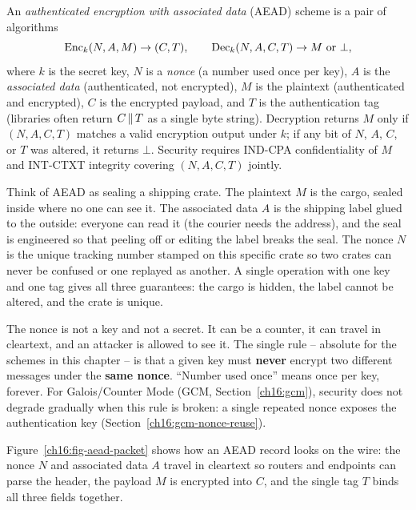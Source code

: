 \begin{definition}[AEAD]
\label{ch16:aead-def}
An \emph{authenticated encryption with associated data} (AEAD) scheme is a pair of algorithms
\[
\operatorname{Enc}_k(N, A, M) \to (C, T), \qquad \operatorname{Dec}_k(N, A, C, T) \to M \text{ or } \bot,
\]
where $k$ is the secret key, $N$ is a \emph{nonce} (a number used once per key), $A$ is the \emph{associated data} (authenticated, not encrypted), $M$ is the plaintext (authenticated and encrypted), $C$ is the encrypted payload, and $T$ is the authentication tag (libraries often return $C \,\|\, T$ as a single byte string). Decryption returns $M$ only if $(N, A, C, T)$ matches a valid encryption output under $k$; if any bit of $N$, $A$, $C$, or $T$ was altered, it returns $\bot$. Security requires IND-CPA confidentiality of $M$ and INT-CTXT integrity covering $(N, A, C, T)$ jointly.
\end{definition}

\begin{intuitionbox}
Think of AEAD as sealing a shipping crate. The plaintext $M$ is the cargo, sealed inside where no one can see it. The associated data $A$ is the shipping label glued to the outside: everyone can read it (the courier needs the address), and the seal is engineered so that peeling off or editing the label breaks the seal. The nonce $N$ is the unique tracking number stamped on this specific crate so two crates can never be confused or one replayed as another. A single operation with one key and one tag gives all three guarantees: the cargo is hidden, the label cannot be altered, and the crate is unique.
\end{intuitionbox}

\begin{focusbox}
The nonce is not a key and not a secret. It can be a counter, it can travel in cleartext, and an attacker is allowed to see it. The single rule -- absolute for the schemes in this chapter -- is that a given key must \textbf{never} encrypt two different messages under the \textbf{same nonce}. ``Number used once'' means once per key, forever. For Galois/Counter Mode (GCM, Section~\ref{ch16:gcm}), security does not degrade gradually when this rule is broken: a single repeated nonce exposes the authentication key (Section~\ref{ch16:gcm-nonce-reuse}).
\end{focusbox}

Figure~\ref{ch16:fig-aead-packet} shows how an AEAD record looks on the wire: the nonce $N$ and associated data $A$ travel in cleartext so routers and endpoints can parse the header, the payload $M$ is encrypted into $C$, and the single tag $T$ binds all three fields together.

